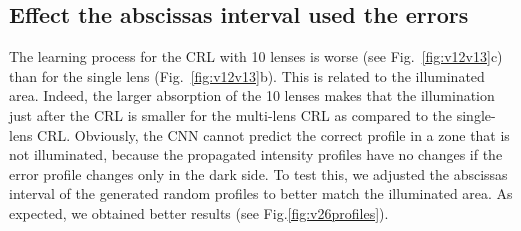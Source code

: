 \documentclass[preprint]{iucr}
\begin{document}
\subsection{Effect the abscissas interval used the errors}
The learning process for the CRL with 10 lenses is worse (see Fig.~\ref{fig:v12v13}c) than for the single lens (Fig.~\ref{fig:v12v13}b). This is related to the illuminated area. Indeed, the larger absorption of the 10 lenses makes that the illumination just after the CRL is smaller for the multi-lens CRL as compared to the single-lens CRL. Obviously, the CNN cannot predict the correct profile in a zone that is not illuminated, because the propagated intensity profiles have no changes if the error profile changes only in the dark side. To test this, we adjusted the abscissas interval of the generated random profiles to better match the illuminated area. As expected, we obtained better results (see Fig.\ref{fig:v26profiles}).
\end{document}
